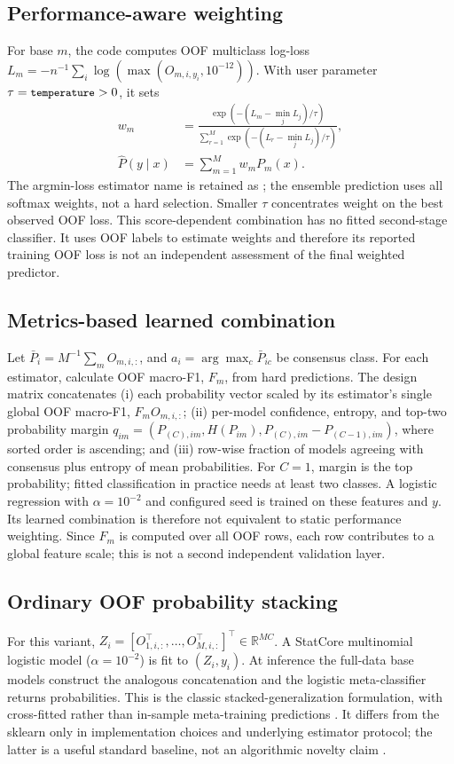 ﻿\documentclass[conference]{IEEEtran}
\begin{document}
\subsection{Performance-aware weighting}
For base \(m\), the code computes OOF multiclass log-loss \(L_m=-n^{-1}\sum_i\log(\max(O_{m,i,y_i},10^{-12}))\). With user parameter \(\tau=\texttt{\small temperature}>0\), it sets
\[
\begin{aligned}
w_m&=\frac{\exp(-(L_m-\min_jL_j)/\tau)}{\sum_{r=1}^M\exp(-(L_r-\min_jL_j)/\tau)},\\
\hat P(y\mid x)&=\sum_{m=1}^M w_mP_m(x).
\end{aligned}
\]
The argmin-loss estimator name is retained as ; the ensemble prediction uses all softmax weights, not a hard selection. Smaller \(\tau\) concentrates weight on the best observed OOF loss. This score-dependent combination has no fitted second-stage classifier. It uses OOF labels to estimate weights and therefore its reported training OOF loss is not an independent assessment of the final weighted predictor.

\subsection{Metrics-based learned combination}
Let \(\bar P_i=M^{-1}\sum_m O_{m,i,:}\), and \(a_i=\arg\max_c\bar P_{ic}\) be consensus class. For each estimator, calculate OOF macro-F1, \(F_m\), from hard predictions. The design matrix concatenates (i) each probability vector scaled by its estimator's single global OOF macro-F1, \(F_mO_{m,i,:}\); (ii) per-model confidence, entropy, and top-two probability margin \(q_{im}=(P_{(C),im},H(P_{im}),P_{(C),im}-P_{(C-1),im})\), where sorted order is ascending; and (iii) row-wise fraction of models agreeing with consensus plus entropy of mean probabilities. For \(C=1\), margin is the top probability; fitted classification in practice needs at least two classes. A logistic regression with \(\alpha=10^{-2}\) and configured seed is trained on these features and \(y\). Its learned combination is therefore not equivalent to static performance weighting. Since \(F_m\) is computed over all OOF rows, each row contributes to a global feature scale; this is not a second independent validation layer.

\subsection{Ordinary OOF probability stacking}
For this variant, \(Z_i=[O_{1,i,:}^\top,\ldots,O_{M,i,:}^\top]^\top\in\mathbb R^{MC}\). A StatCore multinomial logistic model (\(\alpha=10^{-2}\)) is fit to \((Z_i,y_i)\). At inference the full-data base models construct the analogous concatenation and the logistic meta-classifier returns probabilities. This is the classic stacked-generalization formulation, with cross-fitted rather than in-sample meta-training predictions \cite{wolpert1992,breiman1996}. It differs from the sklearn  only in implementation choices and underlying estimator protocol; the latter is a useful standard baseline, not an algorithmic novelty claim \cite{pedregosa2011}.
\end{document}
